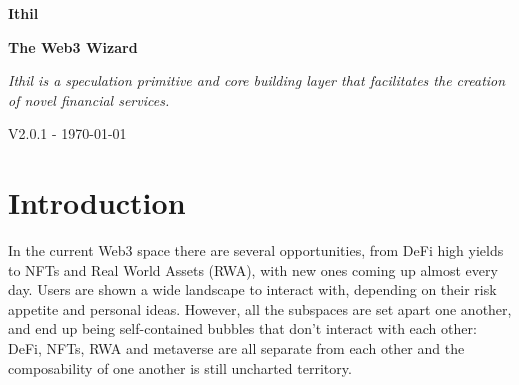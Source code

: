 \documentclass[a4paper,10 pt]{article}
\theoremstyle{definition}
\begin{document}
\begin{titlepage}
    \begin{center}
        \vspace*{1cm}
            
        \Huge
        \textbf{Ithil}

        \vspace{0.5cm}
        \Large
        {\bf The Web3 Wizard}

        \vspace{1cm}
        \Large
        {\it Ithil is a speculation primitive and core building layer that facilitates the creation of novel financial services.}

        \vspace{1.5cm}
        {\normalsize V2.0.1 - \today}
        \vspace{1.0cm}

        \begin{abstract}        
        Ithil aims to become the base layer for decentralised financial services via a well-thought system of composable smart contracts, paired with liquidity vaults to issue debit or credit to.
        
        Modular and easily upgradable, Ithil offers users and other protocols composable, audited lego blocks, enabling an entirely new range of financial opportunities to be created. External protocols can speed up their go-to-market by having an existing infrastructure and access to liquidity from day 1, investors can find novel solutions to speculate on and lenders can get diversifie exposure to the whole web3 space from a single platform.
        \end{abstract}
            
    \end{center}
\tableofcontents
\end{titlepage}

\section{Introduction}

In the current Web3 space there are several opportunities, from DeFi high yields to NFTs and Real World Assets (RWA), with new ones coming up almost every day. Users are shown a wide landscape to interact with, depending on their risk appetite and personal ideas. However, all the subspaces are set apart one another, and end up being self-contained bubbles that don't interact with each other: DeFi, NFTs, RWA and metaverse are all separate from each other and the composability of one another is still uncharted territory.
\end{document}
